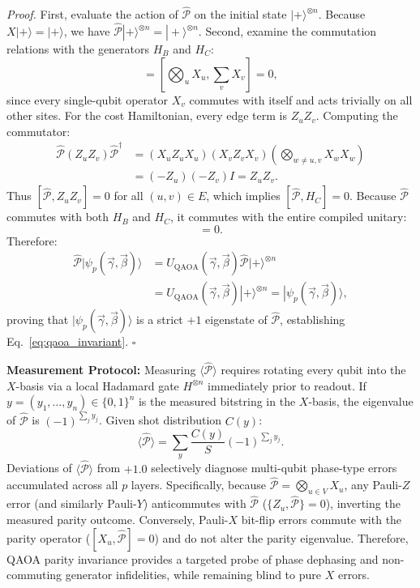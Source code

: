\documentclass[aps,pra,reprint,superscriptaddress,floatfix,nofootinbib]{revtex4-2}
\begin{document}
\emph{Proof.} First, evaluate the action of $\hat{\mathcal{P}}$ on the initial state $|+\rangle^{\otimes n}$. Because $X|+\rangle = |+\rangle$, we have $\hat{\mathcal{P}} |+\rangle^{\otimes n} = |+\rangle^{\otimes n}$.
Second, examine the commutation relations with the generators $H_B$ and $H_C$:
\begin{equation}
[\hat{\mathcal{P}}, H_B] = \left[ \bigotimes_{u} X_u, \sum_v X_v \right] = 0,
\end{equation}
since every single-qubit operator $X_v$ commutes with itself and acts trivially on all other sites.
For the cost Hamiltonian, every edge term is $Z_u Z_v$. Computing the commutator:
\begin{align}
\hat{\mathcal{P}} (Z_u Z_v) \hat{\mathcal{P}}^\dagger &= (X_u Z_u X_u) (X_v Z_v X_v) \left( \bigotimes_{w \neq u, v} X_w X_w \right) \nonumber \\
&= (-Z_u) (-Z_v) I = Z_u Z_v.
\end{align}
Thus $[\hat{\mathcal{P}}, Z_u Z_v] = 0$ for all $(u, v) \in E$, which implies $[\hat{\mathcal{P}}, H_C] = 0$.
Because $\hat{\mathcal{P}}$ commutes with both $H_B$ and $H_C$, it commutes with the entire compiled unitary:
\begin{equation}
[\hat{\mathcal{P}}, U_{\text{QAOA}}(\vec{\gamma}, \vec{\beta})] = 0.
\end{equation}
Therefore:
\begin{align}
\hat{\mathcal{P}} |\psi_p(\vec{\gamma}, \vec{\beta})\rangle &= U_{\text{QAOA}}(\vec{\gamma}, \vec{\beta}) \hat{\mathcal{P}} |+\rangle^{\otimes n} \nonumber \\
&= U_{\text{QAOA}}(\vec{\gamma}, \vec{\beta}) |+\rangle^{\otimes n} = |\psi_p(\vec{\gamma}, \vec{\beta})\rangle,
\end{align}
proving that $|\psi_p(\vec{\gamma}, \vec{\beta})\rangle$ is a strict $+1$ eigenstate of $\hat{\mathcal{P}}$, establishing Eq.~\eqref{eq:qaoa_invariant}. \hfill $\square$

\textbf{Measurement Protocol:} Measuring $\langle \hat{\mathcal{P}} \rangle$ requires rotating every qubit into the $X$-basis via a local Hadamard gate $H^{\otimes n}$ immediately prior to readout. If $y = (y_1, \dots, y_n) \in \{0, 1\}^n$ is the measured bitstring in the $X$-basis, the eigenvalue of $\hat{\mathcal{P}}$ is $(-1)^{\sum_j y_j}$. Given shot distribution $C(y)$:
\begin{equation}
\langle \hat{\mathcal{P}} \rangle = \sum_y \frac{C(y)}{S} (-1)^{\sum_j y_j}.
\end{equation}
Deviations of $\langle \hat{\mathcal{P}} \rangle$ from $+1.0$ selectively diagnose multi-qubit phase-type errors accumulated across all $p$ layers. Specifically, because $\hat{\mathcal{P}} = \bigotimes_{u \in V} X_u$, any Pauli-$Z$ error (and similarly Pauli-$Y$) anticommutes with $\hat{\mathcal{P}}$ ($\{Z_u, \hat{\mathcal{P}}\} = 0$), inverting the measured parity outcome. Conversely, Pauli-$X$ bit-flip errors commute with the parity operator ($[X_u, \hat{\mathcal{P}}] = 0$) and do not alter the parity eigenvalue. Therefore, QAOA parity invariance provides a targeted probe of phase dephasing and non-commuting generator infidelities, while remaining blind to pure $X$ errors.
\end{document}
